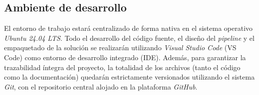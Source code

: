 \subsection{Ambiente de desarrollo}
\label{sec:environment}
El entorno de trabajo estará centralizado de forma nativa en el sistema operativo \textit{Ubuntu 24.04 LTS}. Todo el desarrollo del código fuente, el diseño del \textit{pipeline} y el empaquetado de la solución se realizarán utilizando \textit{Visual Studio Code} (VS Code) como entorno de desarrollo integrado (IDE). Además, para garantizar la trazabilidad íntegra del proyecto, la totalidad de los archivos (tanto el código como la documentación) quedarán estrictamente versionados utilizando el sistema \textit{Git}, con el repositorio central alojado en la plataforma \textit{GitHub}.

